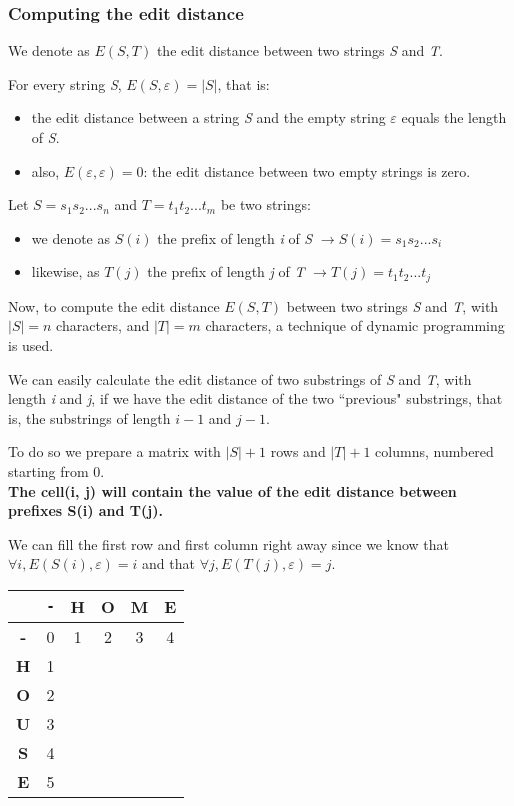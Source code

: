 \documentclass[12pt, letterpaper]{article}
\begin{document}
\subsubsection{Computing the edit distance}

We denote as $E(S, T)$ the edit distance between two strings \emph{S} and \emph{T}.

For every string \emph{S}, $E(S, \varepsilon) = |S|$, that is:
\begin{itemize}
\item the edit distance between a string \emph{S} and the empty string $\varepsilon$ equals the length of \emph{S}.
\item also, $E(\varepsilon, \varepsilon)=0$: the edit distance between two empty strings is zero.
\end{itemize}

Let $S = s_1s_2...s_n$ and $T = t_1t_2...t_m$ be two strings:
\begin{itemize}
\item we denote as $S(i)$ the prefix of length \emph{i} of \emph{S} $\rightarrow S(i) = s_1s_2...s_i$
\item likewise, as $T(j)$ the prefix of length \emph{j} of \emph{T} $\rightarrow T(j) = t_1t_2...t_j$
\end{itemize}
\newpage

Now, to compute the edit distance $E(S, T)$ between two strings \emph{S} and \emph{T}, with $|S| = n$ characters, and $|T|=m$ characters, a technique of dynamic programming is used. 

We can easily calculate the edit distance of two substrings of \emph{S} and \emph{T}, with length \emph{i} and \emph{j}, if we have the edit distance of the two ``previous" substrings, that is, the substrings of length $i-1$ and $j-1$.

To do so we prepare a matrix with $|S| + 1$ rows and $|T| + 1$ columns, numbered starting from 0.\\

\textbf{The cell(i, j) will contain the value of the edit distance between prefixes S(i) and T(j).}

We can fill the first row and first column right away since we know that $\forall i, E(S(i), \varepsilon) = i$ and that $\forall j, E(T(j), \varepsilon) = j$.

\setlength{\tabcolsep}{18pt}
\renewcommand{\arraystretch}{1.5}
\begin{center}
\begin{tabular}{|c|c|c|c|c|c|}
\hline
& \texttt{-} & \textbf{H} & \textbf{O} & \textbf{M} & \textbf{E} \\
\hline
\textbf{-} & 0 & 1 & 2 & 3 & 4 \\
\hline
\textbf{H} & 1 & & & & \\
\hline
\textbf{O} & 2 & & & & \\
\hline
\textbf{U} & 3 & & & & \\
\hline
\textbf{S} & 4 & & & & \\
\hline
\textbf{E} & 5 & & & & \\
\hline
\end{tabular}
\end{center}
\end{document}
